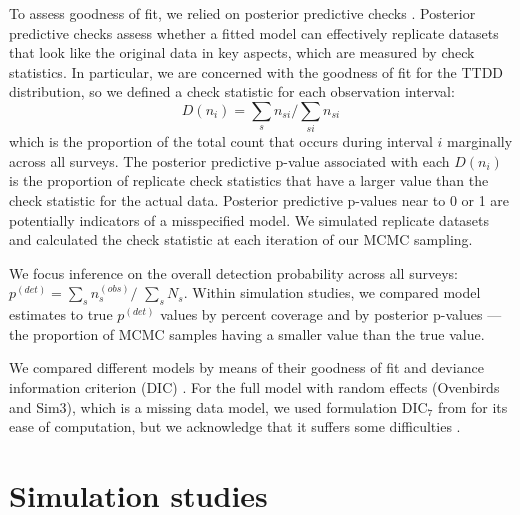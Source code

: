 \documentclass[useAMS,usenatbib,referee,12pt]{article}
\begin{document}
To assess goodness of fit, we relied on posterior predictive checks \citep{Gelman1996}.  
Posterior predictive checks assess whether a fitted model can effectively replicate datasets that look like the original data in key aspects, which are measured by check statistics.  
In particular, we are concerned with the goodness of fit for the TTDD distribution, so we defined a check statistic for each observation interval:
\[D(n_i) = \sum\limits_{s} n_{si} \big/ \sum\limits_{si} n_{si}\]
which is the proportion of the total count that occurs during interval $i$ marginally across all surveys.  
The posterior predictive p-value associated with each $D(n_i)$ is the proportion of replicate check statistics that have a larger value than the check statistic for the actual data.  
Posterior predictive p-values near to 0 or 1 are potentially indicators of a misspecified model.
We simulated replicate datasets and calculated the check statistic at each iteration of our MCMC sampling.  

We focus inference on the overall detection probability across all surveys: $p^{(det)} = \sum\limits_{s}n_{s}^{(obs)}\big/$ $\sum\limits_{s}N_{s}$.  
Within simulation studies, we compared model estimates to true $p^{(det)}$ values by percent coverage and by posterior p-values --- the proportion of MCMC samples having a smaller value than the true value.  

We compared different models by means of their goodness of fit and deviance information criterion (DIC) \citep{Spiegelhalter2002}.  
For the full model with random effects (Ovenbirds and Sim3), which is a missing data model, we used formulation DIC$_7$ from \citet{Celeux2006} for its ease of computation, but we acknowledge that it suffers some difficulties \citep{Celeux2006, Li2014}.





\section{Simulation studies}
\end{document}
